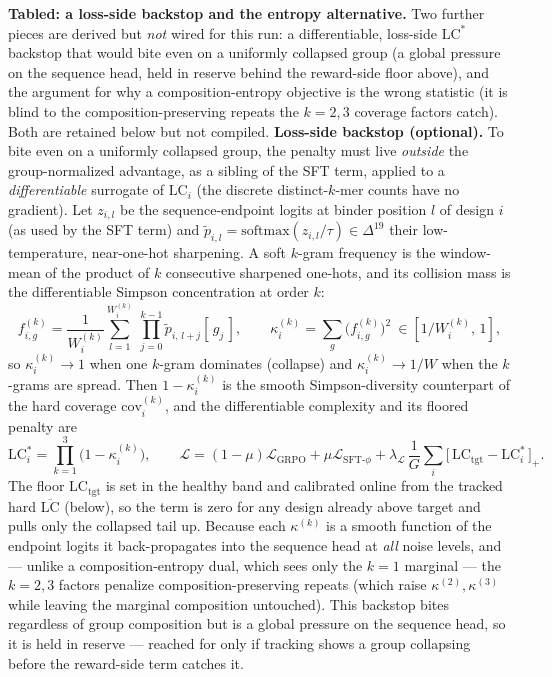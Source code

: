\documentclass[11pt]{article}
\begin{document}
\textbf{Tabled: a loss-side backstop and the entropy alternative.} Two further pieces are derived but
\emph{not} wired for this run: a differentiable, loss-side $\mathrm{LC}^{\ast}$ backstop that would bite
even on a uniformly collapsed group (a global pressure on the sequence head, held in reserve behind the
reward-side floor above), and the argument for why a composition-entropy objective is the wrong statistic
(it is blind to the composition-preserving repeats the $k{=}2,3$ coverage factors catch). Both are
retained below but not compiled.
\iffalse
\textbf{Loss-side backstop (optional).} To bite even on a uniformly collapsed group, the penalty must live
\emph{outside} the group-normalized advantage, as a sibling of the SFT term, applied to a
\emph{differentiable} surrogate of $\mathrm{LC}_i$ (the discrete distinct-$k$-mer counts have no
gradient). Let $z_{i,l}$ be the sequence-endpoint logits at binder position $l$ of design $i$ (as used by
the SFT term) and $\tilde p_{i,l}=\mathrm{softmax}(z_{i,l}/\tau)\in\Delta^{19}$ their low-temperature,
near-one-hot sharpening. A soft $k$-gram frequency is the window-mean of the product of $k$ consecutive
sharpened one-hots, and its collision mass is the differentiable Simpson concentration at order $k$:
\[
f^{(k)}_{i,g}=\frac1{W^{(k)}_i}\sum_{l=1}^{W^{(k)}_i}\ \prod_{j=0}^{k-1}\tilde p_{i,\,l+j}[\,g_j\,],
\qquad
\kappa^{(k)}_i=\sum_{g}\big(f^{(k)}_{i,g}\big)^2\ \in[1/W^{(k)}_i,\,1],
\]
so $\kappa^{(k)}_i\!\to\!1$ when one $k$-gram dominates (collapse) and $\kappa^{(k)}_i\!\to\!1/W$ when the
$k$-grams are spread. Then $1-\kappa^{(k)}_i$ is the smooth Simpson-diversity counterpart of the hard
coverage $\mathrm{cov}^{(k)}_i$, and the differentiable complexity and its floored penalty are
\[
\mathrm{LC}^{\ast}_i=\prod_{k=1}^{3}\big(1-\kappa^{(k)}_i\big),
\qquad
\mathcal L=(1-\mu)\mathcal L_{\mathrm{GRPO}}+\mu\mathcal L_{\text{SFT-}\phi}
   +\lambda_{\mathcal L}\,\frac1G\sum_i\big[\,\mathrm{LC}_{\mathrm{tgt}}-\mathrm{LC}^{\ast}_i\,\big]_+ .
\]
The floor $\mathrm{LC}_{\mathrm{tgt}}$ is set in the healthy band and calibrated online from the tracked
hard $\overline{\mathrm{LC}}$ (below), so the term is zero for any design already above target and pulls
only the collapsed tail up. Because each $\kappa^{(k)}$ is a smooth function of the endpoint logits it
back-propagates into the sequence head at \emph{all} noise levels, and --- unlike a composition-entropy
dual, which sees only the $k{=}1$ marginal --- the $k{=}2,3$ factors penalize composition-preserving
repeats (which raise $\kappa^{(2)},\kappa^{(3)}$ while leaving the marginal composition untouched). This
backstop bites regardless of group composition but is a global pressure on the sequence head, so it is
held in reserve --- reached for only if tracking shows a group collapsing before the reward-side term
catches it.
\end{document}
